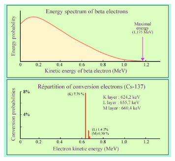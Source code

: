 \begin{figure}
  \centering
  \includegraphics[width=9cm]{timedifference/fig_timediff/SpectreBeta_Cs137.jpg}
  \caption{}
  \label{fig:Tl_IC}
\end{figure}

